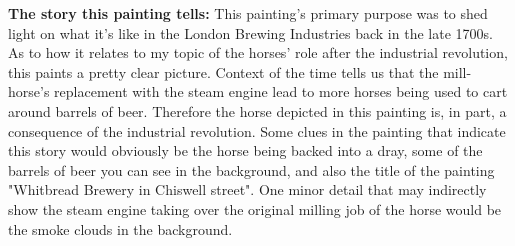 

\textbf{The story this painting tells:} This painting's primary purpose was to shed light on what it's like in the London Brewing Industries back in the late 1700s. As to how it relates to my topic of the horses' role after the industrial revolution, this paints a pretty clear picture.  Context of the time tells us that the mill-horse's replacement with the steam engine lead to more horses being used to cart around barrels of beer.  Therefore the horse depicted in this painting is, in part, a consequence of the industrial revolution. Some clues in the painting that indicate this story would obviously be the horse being backed into a dray, some of the barrels of beer you can see in the background, and also the title of the painting "Whitbread Brewery in Chiswell street".  One minor detail that may indirectly show the steam engine taking over the original milling job of the horse would be the smoke clouds in the background.